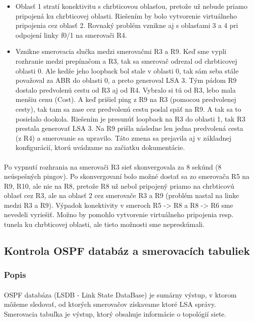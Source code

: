 \documentclass[12pt,twoside,a4paper]{report}
\begin{document}
\begin{itemize}
\item Oblasť 1 stratí konektivitu s chrbticovou oblasťou, pretože už nebude priamo pripojená ku chrbticovej oblasti. Riešením by bolo vytvorenie virtuálneho pripojenia cez oblasť 2. Rovnaký problém vznikne aj s oblasťami 3 a 4 pri odpojení linky f0/1 na smerovači R4.
\item Vznikne smerovacia slučka medzi smerovačmi R3 a R9. Keď sme vypli rozhranie  medzi prepínačom a R3, tak sa smerovač odrezal od chrbticovej oblasti 0. Ale kedže jeho loopback bol stale v oblasti 0, tak sám seba stále považoval za ABR do oblasti 0, a preto generoval LSA 3. Tým pádom R9 dostalo predvolenú cestu od R3 aj od R4. Vybralo si tú od R3, lebo mala menšiu cenu (Cost). A keď prišiel ping z R9 na R3 (pomocou predvolenej cesty), tak tam sa zase cez predvolenú cestu poslal späť na R9. A tak sa to posielalo dookola. Riešením je presunúť loopback na R3 do oblasti 1, tak R3 prestala generovať LSA 3. Na R9 prišla následne len jedna predvolená cesta (z R4) a smerovanie sa upravilo. Táto zmena sa prejavila aj v základnej konfigurácií, ktorú uvádzame na začiatku dokumentácie.
\end{itemize}

\paragraph{}
Po vypnutí rozhrania  na smerovači R3 sieť skonvergovala za 8 sekúnd (8 neúspešných pingov). Po skonvergovaní bolo možné dostať sa zo smerovača R5 na R9, R10, ale nie na R8, pretože R8 už nebol pripojený priamo na chrbticovú oblasť cez R3, ale na oblasť 2 cez smerovače R3 a R9 (problém nastal na linke medzi R3 a R9). Výpadok konektivity v smeroch R5 -\textgreater{} R8 a R8 -\textgreater{} R6 sme nevedeli vyriešiť. Možno by pomohlo vytvorenie virtuálneho pripojenia resp. tunela ku chrbticovej oblasti, ale tieto možnosti sme nepreskúmali.




\subsection{Kontrola OSPF databáz a smerovacích tabuliek}
\subsubsection{Popis}
\paragraph{}
OSPF databáza (LSDB - Link State DataBase) je sumárny výstup, v ktorom môžeme sledovať, od ktorých smerovačov získavame ktoré LSA správy. Smerovacia tabuľka je výstup, ktorý obsahuje informácie o topológií siete.
\end{document}
